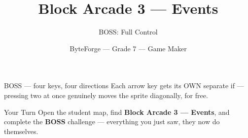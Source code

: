 \documentclass[aspectratio=169]{beamer}
\title{Block Arcade 3 — Events}
\subtitle{BOSS: Full Control}
\author{ByteForge --- Grade 7 --- Game Maker}
\date{}
\begin{document}
\begin{frame}
    \titlepage
\end{frame}

\begin{frame}{BOSS — four keys, four directions}
    \Large
    Each arrow key gets its OWN separate if — pressing two at once genuinely moves the sprite diagonally, for free.

    \begin{center}
    \end{center}
\end{frame}

\begin{frame}{Your Turn}
    \Large
    Open the student map, find \textbf{Block Arcade 3 — Events}, and complete
    the \textbf{BOSS} challenge --- everything you just saw, they now do themselves.
\end{frame}
\end{document}
